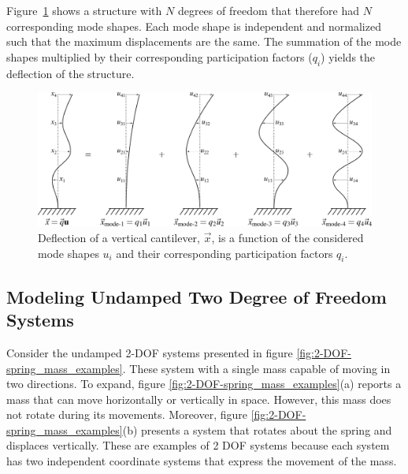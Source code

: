 \documentclass[12pt,letter]{article}
\numberwithin{ex}{section} %
\numberwithin{re}{section} %
\begin{document}
Figure~\ref{fig:general_mode_shapes} shows a structure with $N$ degrees of freedom that therefore had $N$ corresponding mode shapes. Each mode shape is independent and normalized such that the maximum displacements are the same. The summation of the mode shapes multiplied by their corresponding participation factors ($q_i$) yields the deflection of the structure. 


\begin{figure}[H]
	\centering
	\includegraphics[]{../Figures/general_mode_shapes.png}
	\caption{Deflection of a vertical cantilever, $\vec{x}$, is a function of the considered mode shapes $u_i$ and their corresponding participation factors $q_i$.}
	\label{fig:general_mode_shapes}
\end{figure}





\subsection{Modeling Undamped Two Degree of Freedom Systems}
\label{sec:two_degree_of_freedom}

Consider the undamped 2-DOF systems presented in figure \ref{fig:2-DOF-spring_mass_examples}. These system with a single mass capable of moving in two directions. To expand, figure \ref{fig:2-DOF-spring_mass_examples}(a) reports a mass that can move horizontally or vertically in space. However, this mass does not rotate during its movements. Moreover, figure \ref{fig:2-DOF-spring_mass_examples}(b) presents a system that rotates about the spring and displaces vertically. These are examples of 2 DOF systems because each system has two independent coordinate systems that express the movement of the mass. 
\end{document}
